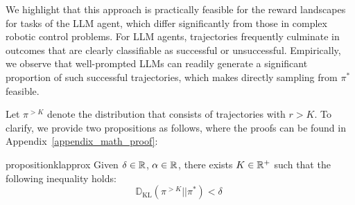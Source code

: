 We highlight that this approach is practically feasible for the reward landscapes for tasks of the LLM agent, which differ significantly from those in complex robotic control problems.
For LLM agents, trajectories frequently culminate in outcomes that are clearly classifiable as successful or unsuccessful.
Empirically, we observe that well-prompted LLMs can readily generate a significant proportion of such successful trajectories, which makes directly sampling from $\pi^*$ feasible.
















Let $\pi^{>K}$ denote the distribution that consists of trajectories with $r > K$.
To clarify, we provide two propositions as follows, where the proofs can be found in Appendix~\ref{appendix_math_proof}:
\begin{restatable}{proposition}{klapprox}
\label{propos_1}
Given $\delta \in \mathbb{R}$, $\alpha \in \mathbb{R}$, there exists $K \in \mathbb{R}^+$ such that the following inequality holds:
\begin{equation*}
    \mathds{D}_{\text{KL}}(\pi^{>K} || \pi^*) < \delta \; 
\end{equation*}
\end{restatable}

